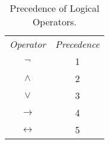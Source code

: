 \documentclass{Axon}
\begin{document}
\begin{table}[h]
    \centering
    \begin{tabular}{c|c}
        \textit{Operator}   & \textit{Precedence} \\
        \(\lnot\)           & 1                   \\
        \(\land\)           & 2                   \\
        \(\lor\)            & 3                   \\
        \(\to\)             & 4                   \\
        \(\leftrightarrow\) & 5
    \end{tabular}
    \caption{Precedence of Logical Operators.}
    \label{Table: 8}
\end{table}

\printbibliography
\end{document}

